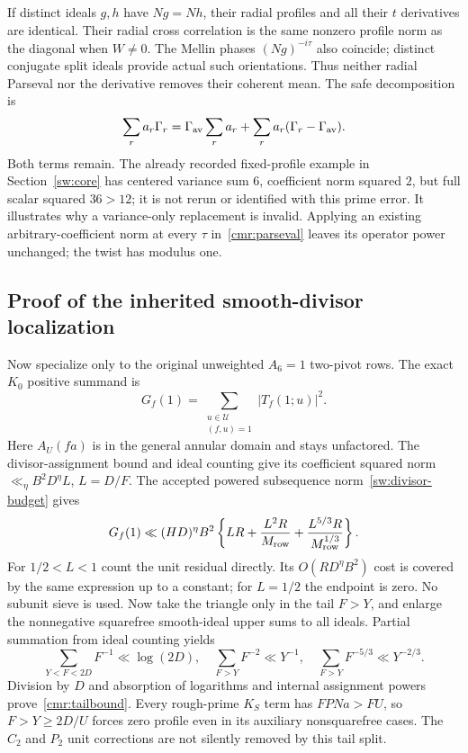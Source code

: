 \documentclass[11pt]{article}
\theoremstyle{definition}\newtheorem{definition}[theorem]{Definition}
\theoremstyle{remark}\newtheorem{remark}[theorem]{Remark}
\begin{document}
If distinct ideals $g,h$ have $Ng=Nh$, their radial profiles and all
their $t$ derivatives are identical. Their radial cross correlation
is the same nonzero profile norm as the diagonal when $W\ne0$.
The Mellin phases $(Ng)^{-i\tau}$ also coincide; distinct conjugate
split ideals provide actual such orientations. Thus neither radial
Parseval nor the derivative removes their coherent mean.
The safe decomposition is
\[
 \sum_r a_r\Gamma_r
   =\Gamma_{\rm av}\sum_ra_r
                 +\sum_ra_r(\Gamma_r-\Gamma_{\rm av}).
\]
Both terms remain. The already recorded fixed-profile example in
Section~\ref{sw:core} has centered variance sum $6$, coefficient norm
squared $2$, but full scalar squared $36>12$; it is not rerun or
identified with this prime error. It illustrates why a variance-only
replacement is invalid. Applying an existing arbitrary-coefficient
norm at every $\tau$ in~\eqref{cmr:parseval} leaves its operator
power unchanged; the twist has modulus one.

\subsection{Proof of the inherited smooth-divisor localization}
\label{cmr:tail-proof}
Now specialize only to the original unweighted $A_6=1$ two-pivot
rows. The exact $K_0$ positive summand is
\[
 G_f(1)=\sum_{\substack{u\in\mathcal U\\(f,u)=1}}
             |T_f(1;u)|^2.
\]
Here $A_U(fa)$ is in the general annular domain and stays unfactored.
The divisor-assignment bound and ideal counting give its coefficient
squared norm $\ll_\eta B^2D^\eta L$, $L=D/F$.
The accepted powered subsequence norm~\eqref{sw:divisor-budget} gives
\[
 G_f(1)\ll(HD)^\eta B^2
 \left\{LR+\frac{L^2R}{M_{\rm row}}
              +\frac{L^{5/3}R}{M_{\rm row}^{1/3}}\right\}.
\]
For $1/2<L<1$ count the unit residual directly. Its
$O(RD^\eta B^2)$ cost is covered by the same expression up to a
constant; for $L=1/2$ the endpoint is zero. No subunit sieve is used.
Now take the triangle only in the tail $F>Y$, and enlarge the
nonnegative squarefree smooth-ideal upper sums to all ideals.
Partial summation from ideal counting yields
\[
 \sum_{Y<F<2D}F^{-1}\ll\log(2D),\quad
 \sum_{F>Y}F^{-2}\ll Y^{-1},\quad
 \sum_{F>Y}F^{-5/3}\ll Y^{-2/3}.
\]
Division by $D$ and absorption of logarithms and internal assignment
powers prove~\eqref{cmr:tailbound}. Every rough-prime $K_S$ term has
$FPNa>FU$, so $F>Y\ge2D/U$ forces zero profile even in its auxiliary
nonsquarefree cases. The $C_2$ and $P_2$ unit corrections are not
silently removed by this tail split.
\end{document}
